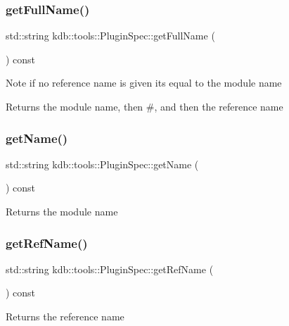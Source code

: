 \subsubsection{\texorpdfstring{getFullName()}{getFullName()}}
{\footnotesize\ttfamily std\+::string kdb\+::tools\+::\+Plugin\+Spec\+::get\+Full\+Name (\begin{DoxyParamCaption}{ }\end{DoxyParamCaption}) const}

\begin{DoxyNote}{Note}
if no reference name is given its equal to the module name
\end{DoxyNote}
\begin{DoxyReturn}{Returns}
the module name, then \#, and then the reference name 
\end{DoxyReturn}
\mbox{\label{classkdb_1_1tools_1_1PluginSpec_a0cfae078fe25b383590bd0a9f679068d}} 
\subsubsection{\texorpdfstring{getName()}{getName()}}
{\footnotesize\ttfamily std\+::string kdb\+::tools\+::\+Plugin\+Spec\+::get\+Name (\begin{DoxyParamCaption}{ }\end{DoxyParamCaption}) const}

\begin{DoxyReturn}{Returns}
the module name 
\end{DoxyReturn}
\mbox{\label{classkdb_1_1tools_1_1PluginSpec_a8792bc54b8e73490b1bad607de756d35}} 
\subsubsection{\texorpdfstring{getRefName()}{getRefName()}}
{\footnotesize\ttfamily std\+::string kdb\+::tools\+::\+Plugin\+Spec\+::get\+Ref\+Name (\begin{DoxyParamCaption}{ }\end{DoxyParamCaption}) const}

\begin{DoxyReturn}{Returns}
the reference name 
\end{DoxyReturn}
\mbox{\label{classkdb_1_1tools_1_1PluginSpec_ab54d0cca8bd39630f16bad71666d5865}} 
